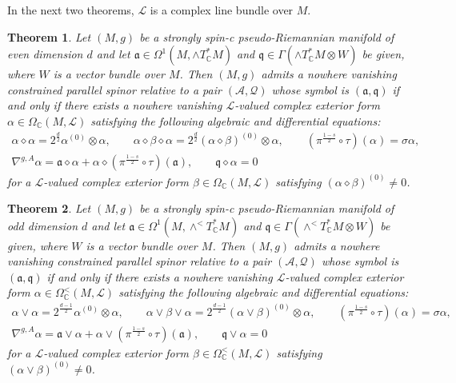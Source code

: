 \documentclass[10pt,a4paper,twoside,reqno]{amsart}
\theoremstyle{plain}
\newtheorem{thm}{Theorem}[section]
\theoremstyle{definition}
\theoremstyle{remark}
\def\C{\mathbb{C}}
\def\cQ{\mathcal{Q}}
\def\fra{\mathfrak{a}}
\def\frq{\mathfrak{q}}
\def\cA{\mathcal{A}}
\def\cL{\mathcal{L}}
\begin{document}
In the next two theorems, $\cL$ is a complex line bundle over $M$.

\begin{thm}
Let $(M,g)$ be a strongly spin-c pseudo-Riemannian manifold of even dimension $d$ and let $\fra\in\Omega^1(M,\wedge T^*_\C M)$ and $\frq\in\Gamma(\wedge T^*_\C M\otimes W)$ be given, where $W$ is a vector bundle over $M$. Then $(M,g)$ admits a nowhere vanishing constrained parallel spinor relative to a pair $(\cA,\cQ)$ whose symbol is $(\fra,\frq)$ if and only if there exists a nowhere vanishing $\cL$-valued complex exterior form $\alpha\in\Omega_\C(M,\cL)$ satisfying the following algebraic and differential equations: 
\begin{gather*}
    \alpha\diamond\alpha=2^{\frac{d}{2}}\alpha^{(0)}\otimes\alpha,\qquad \alpha\diamond\beta\diamond\alpha=2^{\frac{d}{2}}(\alpha\diamond\beta)^{(0)}\otimes\alpha,\qquad (\pi^{\frac{1-s}{2}}\circ\tau)(\alpha)=\sigma\alpha,\\
    \nabla^{g,A}\alpha=\fra\diamond\alpha+\alpha\diamond(\pi^{\frac{1-s}{2}}\circ\tau)(\fra),\qquad \frq\diamond\alpha=0
\end{gather*} 
for a $\cL$-valued complex exterior form $\beta\in\Omega_\C(M,\cL)$ satisfying $(\alpha\diamond\beta)^{(0)}\neq0$.
\end{thm}

\begin{thm} 
Let $(M,g)$ be a strongly spin-c pseudo-Riemannian manifold of odd dimension $d$ and let $\fra\in\Omega^1(M,\wedge^< T^*_\C M)$ and $\frq\in\Gamma(\wedge^< T^*_\C M\otimes W)$ be given, where $W$ is a vector bundle over $M$. Then $(M,g)$ admits a nowhere vanishing constrained parallel spinor relative to a pair $(\cA,\cQ)$ whose symbol is $(\fra,\frq)$ if and only if there exists a nowhere vanishing $\cL$-valued complex exterior form $\alpha\in\Omega^<_\C(M,\cL)$ satisfying the following algebraic and differential equations:
\begin{gather*}
    \alpha\vee\alpha=2^{\frac{d-1}{2}}\alpha^{(0)}\otimes\alpha,\qquad \alpha\vee\beta\vee\alpha=2^{\frac{d-1}{2}}(\alpha\vee\beta)^{(0)}\otimes\alpha,\qquad (\pi^{\frac{1-s}{2}}\circ\tau)(\alpha)=\sigma\alpha,\\
    \nabla^{g,A}\alpha=\fra\vee\alpha+\alpha\vee(\pi^{\frac{1-s}{2}}\circ\tau)(\fra),\qquad \frq\vee\alpha=0
\end{gather*} 
for a $\cL$-valued complex exterior form $\beta\in\Omega^<_\C(M,\cL)$ satisfying $(\alpha\vee\beta)^{(0)}\neq0$.
\end{thm}
\end{document}

